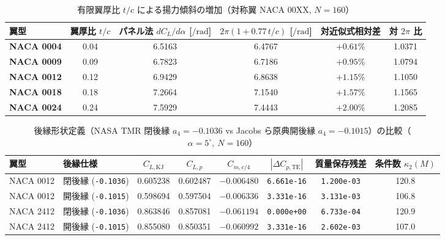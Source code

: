 \documentclass[10pt,a4paper]{article}
\begin{document}
\begin{table}[H]
  \centering
  \caption{有限翼厚比 $t/c$ による揚力傾斜の増加（対称翼 NACA 00XX, $N=160$）}
  \label{tab:thickness}
  \small
  \renewcommand{\arraystretch}{1.28}
  \setlength{\tabcolsep}{7.5pt}
  \begin{tabular}{@{}lccccc@{}}
    \toprule
    翼型 & 翼厚比 $t/c$ & パネル法 $dC_L/d\alpha$ [$/\mathrm{rad}$] & $2\pi(1+0.77\,t/c)$ [$/\mathrm{rad}$] & 対近似式相対差 & 対 $2\pi$ 比 \\
    \midrule
    \textbf{NACA 0004} & 0.04 & 6.5163 & 6.4767 & $+0.61\%$ & 1.0371 \\
    \textbf{NACA 0009} & 0.09 & 6.7823 & 6.7186 & $+0.95\%$ & 1.0794 \\
    \textbf{NACA 0012} & 0.12 & 6.9429 & 6.8638 & $+1.15\%$ & 1.1050 \\
    \textbf{NACA 0018} & 0.18 & 7.2664 & 7.1540 & $+1.57\%$ & 1.1565 \\
    \textbf{NACA 0024} & 0.24 & 7.5929 & 7.4443 & $+2.00\%$ & 1.2085 \\
    \bottomrule
  \end{tabular}
\end{table}

\begin{table}[H]
  \centering
  \caption{後縁形状定義（NASA TMR 閉後縁 $a_4=-0.1036$ vs Jacobs ら原典開後縁 $a_4=-0.1015$）の比較（$\alpha=5^\circ,\ N=160$）}
  \label{tab:te_def}
  \small
  \renewcommand{\arraystretch}{1.28}
  \setlength{\tabcolsep}{5.5pt}
  \begin{tabular}{@{}llcccccc@{}}
    \toprule
    翼型 & 後縁仕様 & $C_{L,\mathrm{KJ}}$ & $C_{L,p}$ & $C_{m,c/4}$ & $|\Delta C_{p,\mathrm{TE}}|$ & 質量保存残差 & 条件数 $\kappa_2(M)$ \\
    \midrule
    NACA 0012 & 閉後縁 (\texttt{-0.1036}) & 0.605238 & 0.602487 & $-0.006480$ & \texttt{6.661e-16} & \texttt{1.200e-03} & 120.8 \\
    NACA 0012 & 開後縁 (\texttt{-0.1015}) & 0.598694 & 0.597504 & $-0.006336$ & \texttt{3.331e-16} & \texttt{3.131e-03} & 106.8 \\
    NACA 2412 & 閉後縁 (\texttt{-0.1036}) & 0.863846 & 0.857081 & $-0.061194$ & \texttt{0.000e+00} & \texttt{6.733e-04} & 120.9 \\
    NACA 2412 & 開後縁 (\texttt{-0.1015}) & 0.855080 & 0.850351 & $-0.060992$ & \texttt{3.331e-16} & \texttt{2.602e-03} & 107.0 \\
    \bottomrule
  \end{tabular}
\end{table}
\end{document}
